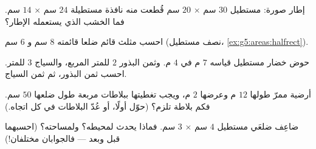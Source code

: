 \begin{exercise}[$\star$]\label{exo:g5:areas:7}
إطار صورة: مستطيل $30$ سم $\times$ $20$ سم قُطعت منه
نافذة مستطيلة $24$ سم $\times$ $14$ سم. فما 
الخشب الذي يستعمله الإطار؟
\end{exercise}

\begin{exercise}[$\star$]\label{exo:g5:areas:8}
احسب  مثلث قائم ضلعا قائمته $8$ سم و $6$ سم
(نصف مستطيل، \cref{ex:g5:areas:halfrect}).
\end{exercise}

\begin{exercise}[$\star$]\label{exo:g5:areas:9}
حوض خضار مستطيل قياسه $7$ م في $4$ م. وثمن البذور
$2$ للمتر المربع، والسياج $3$ للمتر. احسب ثمن
البذور، ثم ثمن السياج.
\end{exercise}

\begin{exercise}[$\star\star$]\label{exo:g5:areas:10}
أرضية ممرّ طولها $12$ م وعرضها $2$ م، ويجب تغطيتها
ببلاطات مربعة طول ضلعها $50$ سم. فكم بلاطة تلزم؟
(حوّل أولًا، أو عُدّ البلاطات في كل اتجاه.)
\end{exercise}

\begin{exercise}[$\star\star$]\label{exo:g5:areas:11}
ضاعِف ضلعَي مستطيل $4$ سم $\times$ $3$ سم. فماذا يحدث
لمحيطه؟ ولمساحته؟ (احسبهما قبل وبعد ---
فالجوابان مختلفان!)
\end{exercise}
